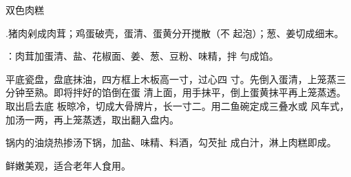 \begin{recipe}[金银肉糕]{双色肉糕}

\ingredients


\cooking

\step .猪肉剁成肉茸；鸡蛋破壳，蛋清、蛋黄分开搅散（不 起泡）；葱、姜切成细末。

\step ：肉茸加蛋清、盐、花椒面、姜、葱、豆粉、味精，拌 勻成馅。

\step 平底瓷盘，盘底抹油，四方框上木板高一寸，过心四 寸。先倒入蛋清，上笼蒸三分钟至熟。即将拌好的馅倒在蛋 清上面，用手抹平，倒上蛋黄抹平再上笼蒸透。取出启去底 板晾冷，切成大骨牌片，长一寸二。用二鱼碗定成三叠水或 风车式，加汤一两，再上笼蒸透，取出翻入盘内。

\step 锅内的油烧热掺汤下锅，加盐、味精、料酒，勾芡扯 成白汁，淋上肉糕即成。

\notes

鲜嫩美观，适合老年人食用。



\end{recipe}

